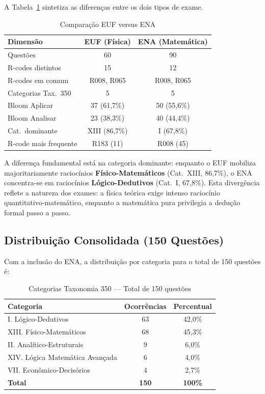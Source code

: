 \documentclass[12pt,a4paper]{article}
\begin{document}
A Tabela~\ref{tab:euf_ena_comparativo} sintetiza as diferenças entre
os dois tipos de exame.

\begin{table}[H]
\centering
\caption{Comparação EUF versus ENA}
\label{tab:euf_ena_comparativo}
\begin{tabular}{lcc}
\toprule
\textbf{Dimensão} & \textbf{EUF (Física)} & \textbf{ENA (Matemática)} \\
\midrule
Questões & 60 & 90 \\
R-codes distintos & 15 & 12 \\
R-codes em comum & R008, R065 & R008, R065 \\
Categorias Tax.~350 & 5 & 5 \\
Bloom Aplicar & 37 (61,7\%) & 50 (55,6\%) \\
Bloom Analisar & 23 (38,3\%) & 40 (44,4\%) \\
Cat.~dominante & XIII (86,7\%) & I (67,8\%) \\
R-code mais frequente & R183 (11) & R008 (45) \\
\bottomrule
\end{tabular}
\end{table}

A diferença fundamental está na categoria dominante: enquanto o EUF
mobiliza majoritariamente raciocínios \textbf{Físico-Matemáticos}
(Cat.~XIII, 86,7\%), o ENA concentra-se em raciocínios
\textbf{Lógico-Dedutivos} (Cat.~I, 67,8\%). Esta divergência reflete
a natureza dos exames: a física teórica exige intenso raciocínio
quantitativo-matemático, enquanto a matemática pura privilegia a
dedução formal passo a passo.

\subsection{Distribuição Consolidada (150 Questões)}

Com a inclusão do ENA, a distribuição por categoria para o total de
150 questões é:

\begin{table}[H]
\centering
\caption{Categorias Taxonomia 350 --- Total de 150 questões}
\label{tab:categorias_150}
\begin{tabular}{lcc}
\toprule
\textbf{Categoria} & \textbf{Ocorrências} & \textbf{Percentual} \\
\midrule
I. Lógico-Dedutivos & 63 & 42,0\% \\
XIII. Físico-Matemáticos & 68 & 45,3\% \\
II. Analítico-Estruturais & 9 & 6,0\% \\
XIV. Lógica Matemática Avançada & 6 & 4,0\% \\
VII. Econômico-Decisórios & 4 & 2,7\% \\
\midrule
\textbf{Total} & \textbf{150} & \textbf{100\%} \\
\bottomrule
\end{tabular}
\end{table}
\end{document}
